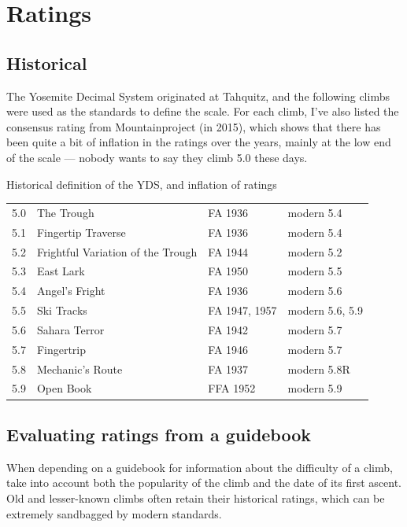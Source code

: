 \documentclass{tahquitz}
\begin{document}
\section{Ratings}

\subsection{Historical}

The Yosemite Decimal System originated at Tahquitz, and the following
climbs were used as the standards to define the scale. For each climb, I've also listed the
consensus rating from Mountainproject (in 2015), which shows that there has been
quite a bit of inflation in the ratings over the years, mainly at the low end of the
scale --- nobody wants to say they climb 5.0 these days.

\begin{mytable}{Historical definition of the YDS, and inflation of ratings}
\begin{tabular}{llll}
5.0 & The Trough                        & FA 1936 & modern  5.4 \\
5.1 & Fingertip Traverse                & FA 1936 & modern  5.4 \\
5.2 & Frightful Variation of the Trough & FA 1944 & modern  5.2 \\
5.3 & East Lark                         & FA 1950 & modern  5.5 \\
5.4 & Angel's Fright                    & FA 1936 & modern  5.6 \\
5.5 & Ski Tracks                        & FA 1947, 1957 & modern  5.6, 5.9 \\
5.6 & Sahara Terror                     & FA 1942 & modern  5.7 \\
5.7 & Fingertrip                        & FA 1946 & modern  5.7 \\
5.8 & Mechanic's Route                  & FA 1937 & modern  5.8R \\
5.9 & Open Book                         & FFA 1952 & modern  5.9
\end{tabular}
\end{mytable}

\subsection{Evaluating ratings from a guidebook}

When depending on a guidebook for information about the difficulty of a climb, take
into account both the popularity of the climb and the date of its first ascent.
Old and lesser-known climbs often retain their historical ratings, which can be
extremely sandbagged by modern standards.
\end{document}
